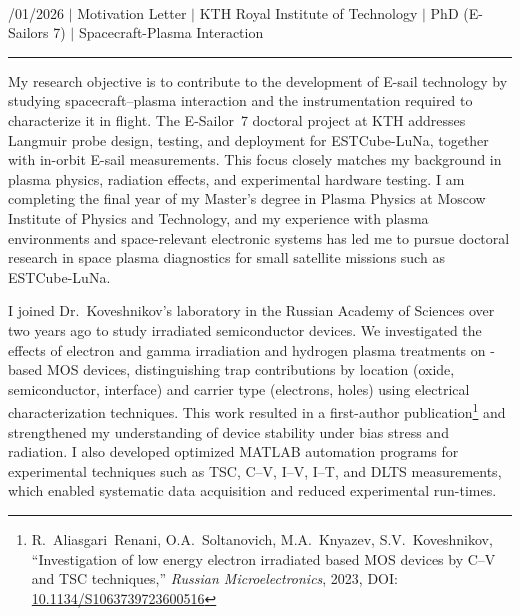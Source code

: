 \documentclass[a4paper,12pt]{article}
\begin{document}
{\centering
  {\scshape {}} \\
  {\fontsize{10}{10}/01/2026} $|$
  {\fontsize{10}{10}\selectfont Motivation Letter} $|$
  {\fontsize{10}{10}\selectfont KTH Royal Institute of Technology} $|$
  {\fontsize{10}{10}\selectfont PhD (E-Sailors 7)} $|$
  {\fontsize{10}{10}\selectfont Spacecraft-Plasma Interaction}
\par}
\vspace{-15pt}
\noindent\rule{\textwidth}{0.5pt}

\vspace{-5pt}

My research objective is to contribute to the development of E-sail technology by studying spacecraft--plasma interaction and the instrumentation required to characterize it in flight. The E-Sailor~7 doctoral project at KTH addresses Langmuir probe design, testing, and deployment for ESTCube-LuNa, together with in-orbit E-sail measurements. This focus closely matches my background in plasma physics, radiation effects, and experimental hardware testing. I am completing the final year of my Master's degree in Plasma Physics at Moscow Institute of Physics and Technology, and my experience with plasma environments and space-relevant electronic systems has led me to pursue doctoral research in space plasma diagnostics for small satellite missions such as ESTCube-LuNa.

I joined Dr.\ Koveshnikov's laboratory in the Russian Academy of Sciences over two years ago to study irradiated semiconductor devices. We investigated the effects of electron and gamma irradiation and hydrogen plasma treatments on -based MOS devices, distinguishing trap contributions by location (oxide, semiconductor, interface) and carrier type (electrons, holes) using electrical characterization techniques. This work resulted in a first-author publication\footnote{R.~Aliasgari~Renani, O.A.~Soltanovich, M.A.~Knyazev, S.V.~Koveshnikov, ``Investigation of low energy electron irradiated  based MOS devices by C--V and TSC techniques,'' \textit{Russian Microelectronics}, 2023, DOI: \href{https://doi.org/10.1134/S1063739723600516}{10.1134/S1063739723600516}} and strengthened my understanding of device stability under bias stress and radiation. I also developed optimized MATLAB automation programs for experimental techniques such as TSC, C--V, I--V, I--T, and DLTS measurements, which enabled systematic data acquisition and reduced experimental run-times.
\end{document}
